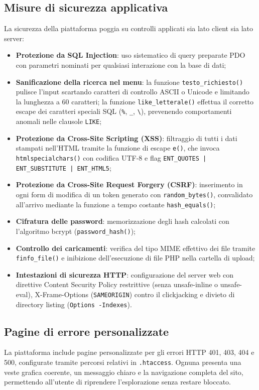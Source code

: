 \documentclass[a4paper,11pt]{article}
\begin{document}
\subsection{Misure di sicurezza applicativa}
La sicurezza della piattaforma poggia su controlli applicati sia lato client sia lato server:
\begin{itemize}
    \item \textbf{Protezione da SQL Injection}: uso sistematico di query preparate PDO con parametri nominati per qualsiasi interazione con la base di dati;
    \item \textbf{Sanificazione della ricerca nel menu}: la funzione \texttt{testo\_richiesto()} pulisce l'input scartando caratteri di controllo ASCII o Unicode e limitando la lunghezza a 60 caratteri; la funzione \texttt{like\_letterale()} effettua il corretto escape dei caratteri speciali SQL (\texttt{\%}, \texttt{\_}, \texttt{\textbackslash}), prevenendo comportamenti anomali nelle clausole \texttt{LIKE};
    \item \textbf{Protezione da Cross-Site Scripting (XSS)}: filtraggio di tutti i dati stampati nell'HTML tramite la funzione di escape \texttt{e()}, che invoca \texttt{htmlspecialchars()} con codifica UTF-8 e flag \texttt{ENT\_QUOTES | ENT\_SUBSTITUTE | ENT\_HTML5};
    \item \textbf{Protezione da Cross-Site Request Forgery (CSRF)}: inserimento in ogni form di modifica di un token generato con \texttt{random\_bytes()}, convalidato all'arrivo mediante la funzione a tempo costante \texttt{hash\_equals()};
    \item \textbf{Cifratura delle password}: memorizzazione degli hash calcolati con l'algoritmo bcrypt (\texttt{password\_hash()});
    \item \textbf{Controllo dei caricamenti}: verifica del tipo MIME effettivo dei file tramite \texttt{finfo\_file()} e inibizione dell'esecuzione di file PHP nella cartella di upload;
    \item \textbf{Intestazioni di sicurezza HTTP}: configurazione del server web con direttive Content Security Policy restrittive (senza unsafe-inline o unsafe-eval), X-Frame-Options (\texttt{SAMEORIGIN}) contro il clickjacking e divieto di directory listing (\texttt{Options -Indexes}).
\end{itemize}

\subsection{Pagine di errore personalizzate}
La piattaforma include pagine personalizzate per gli errori HTTP 401, 403, 404 e 500, configurate tramite percorsi relativi in \texttt{.htaccess}. Ognuna presenta una veste grafica coerente, un messaggio chiaro e la navigazione completa del sito, permettendo all'utente di riprendere l'esplorazione senza restare bloccato.
\end{document}
